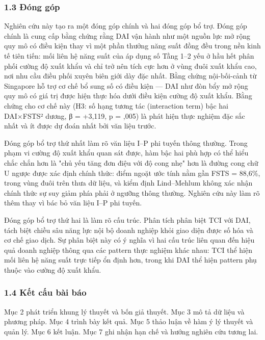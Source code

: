 \documentclass[12pt,a4paper]{article}
\begin{document}
\hypertarget{13-ux111uxf3ng-guxf3p}{%
\subsubsection{1.3 Đóng góp}\label{13-ux111uxf3ng-guxf3p}}

Nghiên cứu này tạo ra một đóng góp chính và hai đóng góp bổ trợ. Đóng
góp chính là cung cấp bằng chứng rằng DAI vận hành như một nguồn lực mở
rộng quy mô có điều kiện thay vì một phần thưởng năng suất đồng đều
trong nền kinh tế tiên tiến: mối liên hệ năng suất của áp dụng số Tầng
1--2 yếu ở hầu hết phân phối cường độ xuất khẩu và chỉ trở nên tích cực
hơn ở vùng đuôi xuất khẩu cao, nơi nhu cầu điều phối xuyên biên giới dày
đặc nhất. Bằng chứng nội-bối-cảnh từ Singapore hỗ trợ cơ chế bổ sung số
có điều kiện --- DAI như đòn bẩy mở rộng quy mô có giá trị được hiện
thực hóa dưới điều kiện cường độ xuất khẩu. Bằng chứng cho cơ chế này
(H3: số hạng tương tác (interaction term) bậc hai DAI×FSTS² dương, β =
+3,119, p = ,005) là phát hiện thực nghiệm đặc sắc nhất và ít được dự
đoán nhất bởi văn liệu trước.

Đóng góp bổ trợ thứ nhất làm rõ văn liệu I--P phi tuyến thông thường.
Trong phạm vi cường độ xuất khẩu quan sát được, hàm bậc hai phù hợp có
thể hiểu chắc chắn hơn là "chủ yếu tăng đơn điệu với độ cong nhẹ" hơn là
đường cong chữ U ngược được xác định chính thức: điểm ngoặt ước tính nằm
gần FSTS = 88,6\%, trong vùng đuôi trên thưa dữ liệu, và kiểm định
Lind--Mehlum không xác nhận chính thức sự suy giảm phía phải ở ngưỡng
thông thường. Nghiên cứu này làm rõ thêm thay vì bác bỏ văn liệu I--P
phi tuyến.

Đóng góp bổ trợ thứ hai là làm rõ cấu trúc. Phân tích phân biệt TCI với
DAI, tách biệt chiều sâu năng lực nội bộ doanh nghiệp khỏi giao diện
được số hóa và cơ chế giao dịch. Sự phân biệt này có ý nghĩa vì hai cấu
trúc liên quan đến hiệu quả doanh nghiệp thông qua các pattern thực
nghiệm khác nhau: TCI thể hiện mối liên hệ năng suất trực tiếp ổn định
hơn, trong khi DAI thể hiện pattern phụ thuộc vào cường độ xuất khẩu.

\hypertarget{14-kux1ebft-cux1ea5u-buxe0i-buxe1o}{%
\subsubsection{1.4 Kết cấu bài
báo}\label{14-kux1ebft-cux1ea5u-buxe0i-buxe1o}}

Mục 2 phát triển khung lý thuyết và bốn giả thuyết. Mục 3 mô tả dữ liệu
và phương pháp. Mục 4 trình bày kết quả. Mục 5 thảo luận về hàm ý lý
thuyết và quản lý. Mục 6 kết luận. Mục 7 ghi nhận hạn chế và hướng
nghiên cứu tương lai.
\end{document}
